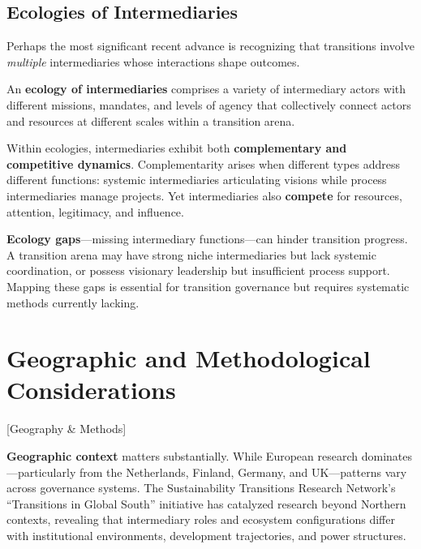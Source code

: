 \documentclass[../main.tex]{subfiles}
\begin{document}
\subsection{Ecologies of Intermediaries}

Perhaps the most significant recent advance is recognizing that transitions involve \emph{multiple} intermediaries whose interactions shape outcomes.

\begin{roledef}
An \textbf{ecology of intermediaries} comprises a variety of intermediary actors with different missions, mandates, and levels of agency that collectively connect actors and resources at different scales within a transition arena.
\end{roledef}

Within ecologies, intermediaries exhibit both \textbf{complementary and competitive dynamics}. Complementarity arises when different types address different functions: systemic intermediaries articulating visions while process intermediaries manage projects. Yet intermediaries also \textbf{compete} for resources, attention, legitimacy, and influence.

\textbf{Ecology gaps}---missing intermediary functions---can hinder transition progress. A transition arena may have strong niche intermediaries but lack systemic coordination, or possess visionary leadership but insufficient process support. Mapping these gaps is essential for transition governance but requires systematic methods currently lacking.


\section{Geographic and Methodological Considerations}[Geography \& Methods]

\textbf{Geographic context} matters substantially. While European research dominates---particularly from the Netherlands, Finland, Germany, and UK---patterns vary across governance systems. The Sustainability Transitions Research Network's ``Transitions in Global South'' initiative has catalyzed research beyond Northern contexts, revealing that intermediary roles and ecosystem configurations differ with institutional environments, development trajectories, and power structures.
\end{document}
